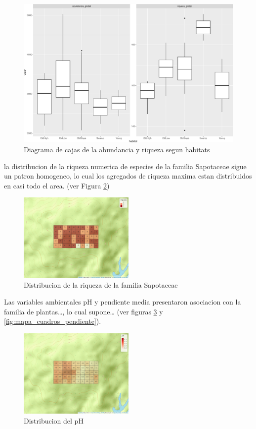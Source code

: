 \documentclass[11pt,]{article}
\begin{document}
\begin{figure}
\centering
\includegraphics{manuscrito_files/figure-latex/unnamed-chunk-4-1.pdf}
\caption{\label{fig:P13}Diagrama de cajas de la abundancia y riqueza
segun habitats}
\end{figure}

la distribucion de la riqueza numerica de especies de la familia
Sapotaceae sigue un patron homogeneo, lo cual los agregados de riqueza
maxima estan distribuidos en casi todo el area. (ver Figura
\ref{fig:mapa_cuadros_riq_mi_familia})

\begin{figure}
\centering
\includegraphics[width=0.50000\textwidth]{mapa_cuadros_riq_mi_familia.png}
\caption{Distribucion de la riqueza de la familia
Sapotaceae\label{fig:mapa_cuadros_riq_mi_familia}}
\end{figure}

Las variables ambientales pH y pendiente media presentaron asociacion
con la familia de plantas\ldots{}, lo cual supone\ldots{} (ver figuras
\ref{fig:mapa_cuadros_pH} y \ref{fig:mapa_cuadros_pendiente}).

\begin{figure}
\centering
\includegraphics[width=0.50000\textwidth]{mapa_cuadros_ph.png}
\caption{Distribucion del pH\label{fig:mapa_cuadros_pH}}
\end{figure}
\end{document}
